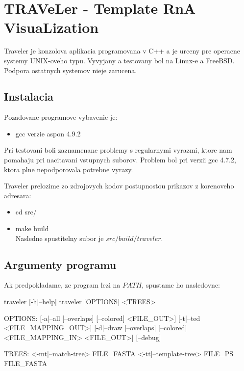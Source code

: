 \newcommand{\paramI}[1]{\text{-}\ensuremath{#1}}
\newcommand{\param}[1]{\text{\--\--}\ensuremath{#1}}

\chapter{TRAVeLer - Template RnA VisuaLization}

Traveler je konzolova aplikacia programovana v C++ a je urceny pre operacne systemy UNIX-oveho typu.
Vyvyjany a testovany bol na Linux-e a FreeBSD. Podpora ostatnych systemov nieje zarucena.

\section{Instalacia}

Pozadovane programove vybavenie je:
\begin{itemize}
  \item gcc verzie aspon 4.9.2
\end{itemize}

Pri testovani boli zaznamenane problemy s regularnymi vyrazmi, ktore nam pomahaju pri nacitavani
vstupnych suborov. Problem bol pri verzii gcc 4.7.2, ktora plne nepodporovala potrebne vyrazy.

Traveler prelozime zo zdrojovych kodov postupnostou prikazov z korenoveho adresara:
\begin{itemize}
  \item cd src/
  \item make build
    \\
    Nasledne spustitelny subor je $src/build/traveler$.
\end{itemize}

\section{Argumenty programu}

Ak predpokladame, ze program lezi na $PATH$, spustame ho nasledovne:

\begin{code}[frame=none]
traveler [-h|--help]
traveler [OPTIONS] <TREES>

OPTIONS:
  [-a|--all [--overlaps] [--colored] <FILE_OUT>]
  [-t|--ted <FILE_MAPPING_OUT>]
  [-d|--draw [--overlaps] [--colored] <FILE_MAPPING_IN> <FILE_OUT>]
  [--debug]

TREES:
  <-mt|--match-tree> FILE_FASTA
  <-tt|--template-tree> FILE_PS FILE_FASTA
\end{code}

